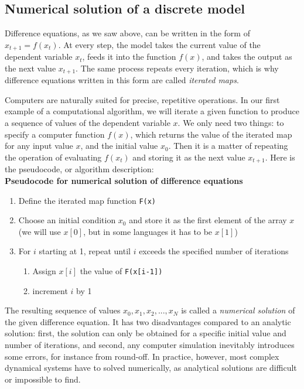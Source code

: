 \documentclass[11pt]{book}
\begin{document}
\subsection{Numerical solution of a discrete model}
Difference equations, as we saw above, can be written in the form of $x_{t+1} = f(x_t)$. At every step, the model takes the current value of the dependent variable $x_t$, feeds it into the function $f(x)$, and takes the output as the next value $x_{t+1}$. The same process repeats every iteration, which is why difference equations written in this form are called \emph{iterated maps}.

Computers are naturally suited for precise, repetitive operations. In our first example of a computational algorithm, we will iterate a given function to produce a sequence of values of the dependent variable $x$. We only need two things: to specify a computer function $f(x)$, which returns the value of the iterated map for any input value $x$, and the initial value $x_0$. Then it is a matter of repeating the operation of evaluating $f(x_t)$ and storing it as the next value $x_{t+1}$. Here is the pseudocode, or algorithm description: \\
\textbf{Pseudocode for numerical solution of difference equations}
\begin{enumerate}
\item Define the iterated map function \texttt{F(x)}
\item Choose an initial condition $x_0$ and store it as the first element of the array $x$ (we will use $x[0]$, but in some languages it has to be $x[1]$)
\item For $i$ starting at 1, repeat until $i$ exceeds the specified number of iterations
\begin{enumerate}
\item  Assign $x[i] $ the value of \texttt{F(x[i-1])}
\item increment $i$ by 1
\end{enumerate}
\end{enumerate}
The resulting sequence of values $x_0, x_1, x_2, ... , x_N$ is called a \emph{numerical solution} of the given difference equation. It has two disadvantages compared to an analytic solution: first, the solution can only be obtained for a specific initial value and number of iterations, and second, any computer simulation inevitably introduces some errors, for instance from round-off. In practice, however, most complex dynamical systems have to solved numerically, as analytical solutions are difficult or impossible to find.
\end{document}
